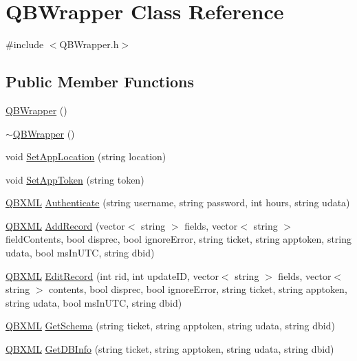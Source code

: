 \hypertarget{class_q_b_wrapper}{}\section{Q\+B\+Wrapper Class Reference}
\label{class_q_b_wrapper}


{\ttfamily \#include $<$Q\+B\+Wrapper.\+h$>$}

\subsection*{Public Member Functions}
\begin{DoxyCompactItemize}
\item 
\hyperlink{class_q_b_wrapper_af53be4336b122a01f5fe4731e1ac612a}{Q\+B\+Wrapper} ()
\item 
\hyperlink{class_q_b_wrapper_a68833457b1963e6cb888f39702d9d7df}{$\sim$\+Q\+B\+Wrapper} ()
\item 
void \hyperlink{class_q_b_wrapper_acb5c3565b3f0a4a6332b524d5b300b70}{Set\+App\+Location} (string location)
\item 
void \hyperlink{class_q_b_wrapper_a306867c866078edb73acd59235f8a417}{Set\+App\+Token} (string token)
\item 
\hyperlink{class_q_b_x_m_l}{Q\+B\+X\+M\+L} \hyperlink{class_q_b_wrapper_aeac0cd9c9c43c54fa0c965001b8361ac}{Authenticate} (string username, string password, int hours, string udata)
\item 
\hyperlink{class_q_b_x_m_l}{Q\+B\+X\+M\+L} \hyperlink{class_q_b_wrapper_ae7d56cc01f73dad3fc80871337336a66}{Add\+Record} (vector$<$ string $>$ fields, vector$<$ string $>$ field\+Contents, bool disprec, bool ignore\+Error, string ticket, string apptoken, string udata, bool ms\+In\+U\+T\+C, string dbid)
\item 
\hyperlink{class_q_b_x_m_l}{Q\+B\+X\+M\+L} \hyperlink{class_q_b_wrapper_a91a75b6d40df547582f8afac5bbc3da8}{Edit\+Record} (int rid, int update\+I\+D, vector$<$ string $>$ fields, vector$<$ string $>$ contents, bool disprec, bool ignore\+Error, string ticket, string apptoken, string udata, bool ms\+In\+U\+T\+C, string dbid)
\item 
\hyperlink{class_q_b_x_m_l}{Q\+B\+X\+M\+L} \hyperlink{class_q_b_wrapper_a8f525eba166a9ead5b945a4d4a35d0a6}{Get\+Schema} (string ticket, string apptoken, string udata, string dbid)
\item 
\hyperlink{class_q_b_x_m_l}{Q\+B\+X\+M\+L} \hyperlink{class_q_b_wrapper_a1b584e685675bc48e1084a84d6db0dd9}{Get\+D\+B\+Info} (string ticket, string apptoken, string udata, string dbid)

\end{DoxyCompactItemize}
